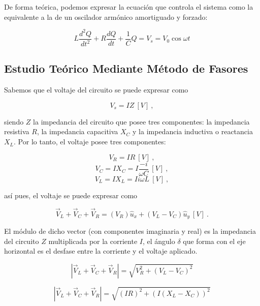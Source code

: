 \documentclass[journal]{IEEEtran}
\begin{document}
De forma teórica, podemos expresar la ecuación que controla el sistema como la equivalente a la de un oscilador armónico amortiguado y forzado:

\begin{equation}
L\frac{d^2Q}{dt^2} + R\frac{dQ}{dt} + \frac{1}{C}Q = V_s = V_0\cos{\omega t}
\end{equation}

\subsection{Estudio Teórico Mediante Método de Fasores}
\label{subsec:estudioteorico}

Sabemos que el voltaje del circuito se puede expresar como

\begin{equation}
V_s = IZ~[V]~,
\end{equation}

siendo $Z$ la impedancia del circuito que posee tres componentes: la impedancia resistiva $R$, la impedancia capacitiva $X_C$ y la impedancia inductiva o reactancia $X_L$. Por lo tanto, el voltaje posee tres componentes:

\begin{equation}
V_R = IR~[V]~,
\end{equation}
\begin{equation}
V_C = IX_C = I \frac{-i}{\omega C}~[V]~,
\end{equation}
\begin{equation}
V_L = IX_L = Ii\omega L~[V]~,
\end{equation}

así pues, el voltaje se puede expresar como

\begin{equation}
\vec{V}_L + \vec{V}_C + \vec{V}_R = (V_R)\hat{u}_x + (V_L - V_C)\hat{u}_y~[V]~.
\end{equation}

El módulo de dicho vector (con componentes imaginaria y real) es la impedancia del circuito $Z$ multiplicada por la corriente $I$, el ángulo $\delta$ que forma con el eje horizontal es el desfase entre la corriente y el voltaje aplicado.

\begin{equation}
|\vec{V}_L + \vec{V}_C + \vec{V}_R| = \sqrt{V_R^2 + (V_L - V_C)^2}
\end{equation}

\begin{equation}
|\vec{V}_L + \vec{V}_C + \vec{V}_R| = \sqrt{(IR)^2 + (I(X_L - X_C))^2}
\end{equation}
\end{document}
